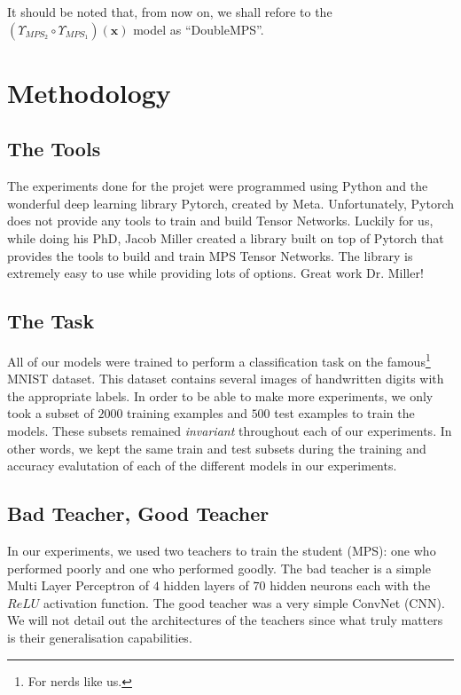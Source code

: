 \documentclass{article}
\theoremstyle{definition}
\theoremstyle{definition}
\begin{document}
It should be noted that, from now on, we shall refore to the $\left(\Upsilon_{MPS_2} \circ \Upsilon_{MPS_1}\right)(\mathbf{x})$ model as \enquote{DoubleMPS}.

\section{Methodology}

\subsection{The Tools}
The experiments done for the projet were programmed using Python and the wonderful deep learning library Pytorch, created by Meta.
Unfortunately, Pytorch does not provide any tools to train and build Tensor Networks. 
Luckily for us, while doing his PhD, Jacob Miller created a library \cite{torchmps} built on top of Pytorch that provides the tools to build and train MPS Tensor Networks. The library is extremely easy to use while providing lots of options. Great work Dr. Miller!

\subsection{The Task}
All of our models were trained to perform a classification task on the famous\footnote{For nerds like us.} MNIST dataset. This dataset contains several images of handwritten digits with the appropriate labels. In order to be able to make more experiments, we only took a subset of $2000$ training examples and $500$ test examples to train the models. These subsets remained \emph{invariant} throughout each of our experiments. In other words, we kept the same train and test subsets during the training and accuracy evalutation of each of the different models in our experiments.

\subsection{Bad Teacher, Good Teacher}
In our experiments, we used two teachers to train the student (MPS): one who performed poorly and one who performed goodly.
The bad teacher is a simple Multi Layer Perceptron of $4$ hidden layers of $70$ hidden neurons each with the $ReLU$ activation function.  The good teacher was a very simple ConvNet (CNN). We will not detail out the architectures of the teachers since what truly matters is their generalisation capabilities.
\end{document}
